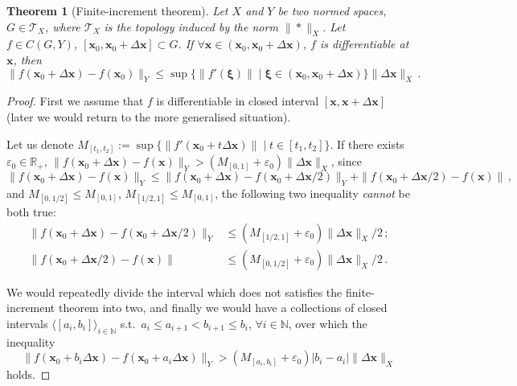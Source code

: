 \documentclass[openany]{book}
\theoremstyle{plain}
\newtheorem{theorem}{Theorem}[section] %
\theoremstyle{definition}
\newcommand*{\bv}{\boldsymbol} %
\begin{document}
\begin{theorem}[Finite-increment theorem]
	\label{theorem: finite-increment theorem}
	Let $X$ and $Y$ be two normed spaces, $G \in \mathscr T_X$, where $\mathscr T_X$ is the topology induced by the norm $\|*\|_X$. 
	Let $f \in C(G, Y)$, $[\bv x_0, \bv x_0 + \Delta \bv x] \subset G$.
	If $\forall \bv x \in (\bv x_0, \bv x_0 + \Delta \bv x)$, $f$ is differentiable at $\bv x$, then
	\begin{equation*}
		\|f(\bv x_0 + \Delta \bv x) - f(\bv x_0)\|_Y 
			\leq \sup \{\|f'(\bv \xi)\|  \mid \bv \xi \in (\bv x_0, \bv x_0 + \Delta \bv x)\} \|\Delta \bv x\|_X\,.
	\end{equation*}
\end{theorem}
\begin{proof}
	First we assume that $f$ is differentiable in closed interval $[\bv x, \bv x + \Delta \bv x]$ (later we would return to the more generalised situation).

	Let us denote $M_{[t_1, t_2]} := \sup \{\|f'(\bv x_0 + t\Delta \bv x)\|  \mid t \in [t_1, t_2] \}$. 
	If there exists $\varepsilon_0 \in \mathbb R_+$, $\|f(\bv x_0 + \Delta \bv x) - f(\bv x)\|_Y > (M_{[0, 1]} + \varepsilon_0) \|\Delta \bv x\|_X$, since 
	\begin{equation*}
		\|f(\bv x_0 + \Delta \bv x) - f(\bv x)\|_Y \leq
		\|f(\bv x_0 + \Delta \bv x) - f(\bv x_0 + \Delta \bv x / 2)\|_Y
			+ \|f(\bv x_0 + \Delta \bv x / 2) - f(\bv x)\|\,,
	\end{equation*}
	and $M_{[0, 1/2]} \leq M_{[0, 1]}$, $M_{[1/2, 1]} \leq M_{[0, 1]}$, the following two inequality \emph{cannot} be both true: 
	\begin{align*}
		\|f(\bv x_0 + \Delta \bv x) - f(\bv x_0 + \Delta \bv x / 2)\|_Y 
			&\leq (M_{[1/2, 1]} + \varepsilon_0) \|\Delta \bv x\|_X/2\,;
		\\
		\|f(\bv x_0 + \Delta \bv x / 2) - f(\bv x)\| 
			&\leq (M_{[0, 1/2]} + \varepsilon_0) \|\Delta \bv x\|_X / 2 \,.
	\end{align*} 
	
	We would repeatedly divide the interval which does not satisfies the finite-increment theorem into two, and finally we would have a collections of closed intervals $\langle[a_i, b_i]\rangle_{i \in \mathbb N}$ s.t.\ $a_i \leq a_{i + 1} < b_{i +1} \leq b_i$, $\forall i \in \mathbb N$, over which the inequality
	\begin{equation*}
		\|f(\bv x_0 + b_i \Delta \bv x) - f(\bv x_0 + a_i \Delta \bv x)\|_Y
			> (M_{[a_i, b_i]} + \varepsilon_0) |b_i - a_i| \|\Delta \bv x\|_X
	\end{equation*}
	holds.


\end{proof}
\end{document}
